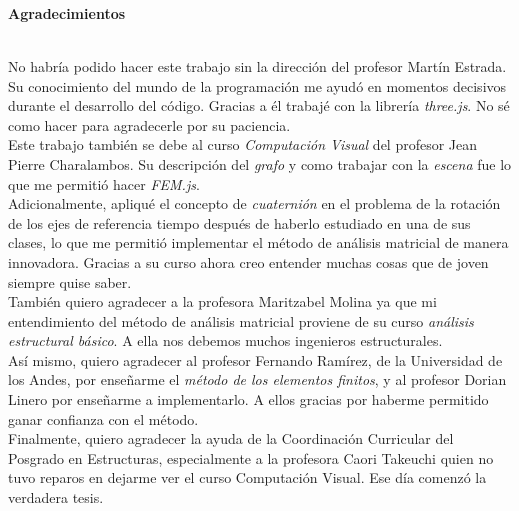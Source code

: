 \newpage{\pagestyle{empty}\cleardoublepage}

\newpage
\thispagestyle{empty} \textbf{}\normalsize
\\\\\\%
\textbf{\LARGE Agradecimientos}
\\

No habría podido hacer este trabajo sin la dirección del profesor Martín Estrada. Su conocimiento del mundo de la programación me ayudó en momentos decisivos durante el desarrollo del código. Gracias a él trabajé con la librería \emph{three.js}. No sé como hacer para agradecerle por su paciencia.\\

Este trabajo también se debe al curso \emph{Computación Visual} del profesor Jean Pierre Charalambos. Su descripción del \emph{grafo} y como trabajar con la \emph{escena} fue lo que me permitió hacer \emph{FEM.js}.\\

Adicionalmente, apliqué el concepto de \emph{cuaternión} en el problema de la rotación de los ejes de referencia tiempo después de haberlo estudiado en una de sus clases, lo que me permitió implementar el método de análisis matricial de manera innovadora. Gracias a su curso ahora creo entender muchas cosas que de joven siempre quise saber.\\

También quiero agradecer a la profesora Maritzabel Molina ya que mi entendimiento del método de análisis matricial proviene de su curso \emph{análisis estructural básico}. A ella nos debemos muchos ingenieros estructurales.\\

Así mismo, quiero agradecer al profesor Fernando Ramírez, de la Universidad de los Andes, por enseñarme el \emph{método de los elementos finitos}, y al profesor Dorian Linero por enseñarme a implementarlo. A ellos gracias por haberme permitido ganar confianza con el método.\\

Finalmente, quiero agradecer la ayuda de la Coordinación Curricular del Posgrado en Estructuras, especialmente a la profesora Caori Takeuchi quien no tuvo reparos en dejarme ver el curso Computación Visual. Ese día comenzó la verdadera tesis.\\
 


\newpage{\pagestyle{empty}\cleardoublepage}

